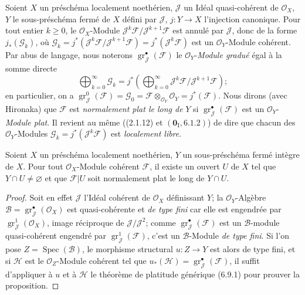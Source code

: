 \begin{env}[6.10.1]
Soient $X$ un préschéma localement noethérien, $\mathcal J$ un Idéal
quasi-cohérent de $\mathcal O_X$, $Y$ le sous-préschéma fermé de $X$ défini
par $\mathcal J$, $j:Y\to X$ l'injection canonique. Pour tout entier $k\geq0$,
le $\mathcal O_X$-Module
$\mathcal J^k\mathcal F/\mathcal J^{k+1}\mathcal F$ est annulé par
$\mathcal J$, donc de la forme $j_*(\mathcal G_k)$, où $\mathcal G_k=j^*(\mathcal J^k\mathcal F/\mathcal J^{k+1}\mathcal F)=j^*(\mathcal J^k\mathcal F)$
est un $\mathcal O_Y$-Module cohérent. Par abus de langage, nous noterons
$\operatorname{gr}_{\mathcal J}^{\bullet}(\mathcal F)$ le
$\mathcal O_Y$-\emph{Module gradué} égal à la somme directe
\[
\bigoplus_{k=0}^{\infty}\mathcal G_k
=j^*\left(\bigoplus_{k=0}^{\infty}
\mathcal J^k\mathcal F/\mathcal J^{k+1}\mathcal F\right);
\]
en particulier, on a
$\operatorname{gr}_{\mathcal J}^{0}(\mathcal F)=\mathcal G_0
=\mathcal F\otimes_{\mathcal O_Y}\mathcal O_Y=j^*(\mathcal F)$. Nous dirons
(avec Hironaka) que $\mathcal F$ est \emph{normalement plat le long de} $Y$ si
$\operatorname{gr}_{\mathcal J}^{\bullet}(\mathcal F)$ est un
$\mathcal O_Y$-\emph{Module plat}. Il revient au même ((2.1.12) et
$(\mathbf{0}_{\mathrm I},6.1.2)$) de dire que chacun des $\mathcal O_Y$-Modules
$\mathcal G_k=j^*(\mathcal J^k\mathcal F)$ est \emph{localement libre}.
\end{env}

\begin{proposition}[6.10.2]
\label{IV.2.s6.10.2-fr}
Soient $X$ un préschéma localement noethérien, $Y$ un sous-préschéma fermé
\textup{intègre} de $X$. Pour tout $\mathcal O_X$-Module cohérent $\mathcal F$, il
existe un ouvert $U$ de $X$ tel que $Y\cap U\ne\varnothing$ et que
$\mathcal F|U$ soit normalement plat le long de $Y\cap U$.
\end{proposition}

\begin{proof}
Soit en effet $\mathcal J$ l'Idéal cohérent de $\mathcal O_X$ définissant
$Y$; la $\mathcal O_Y$-Algèbre
$\mathcal B=\operatorname{gr}_{\mathcal J}^{\bullet}(\mathcal O_X)$ est
quasi-cohérente et \emph{de type fini} car elle est engendrée par
$\operatorname{gr}_{\mathcal J}^{1}(\mathcal O_X)$, image réciproque de
$\mathcal J/\mathcal J^2$; comme
$\operatorname{gr}_{\mathcal J}^{\bullet}(\mathcal F)$ est un
$\mathcal B$-module quasi-cohérent engendré par
$\operatorname{gr}_{\mathcal J}^{1}(\mathcal F)$, c'est un
$\mathcal B$-Module \emph{de type fini}. Si l'on pose
$Z=\operatorname{Spec}(\mathcal B)$, le morphisme structural $u:Z\to Y$ est
alors de type fini, et si $\mathcal H$ est le $\mathcal O_Z$-Module cohérent
tel que $u_*(\mathcal H)=\operatorname{gr}_{\mathcal J}^{\bullet}(\mathcal F)$,
il suffit d'appliquer à $u$ et à $\mathcal H$ le théorème de platitude
générique (6.9.1) pour prouver la proposition.
\end{proof}

